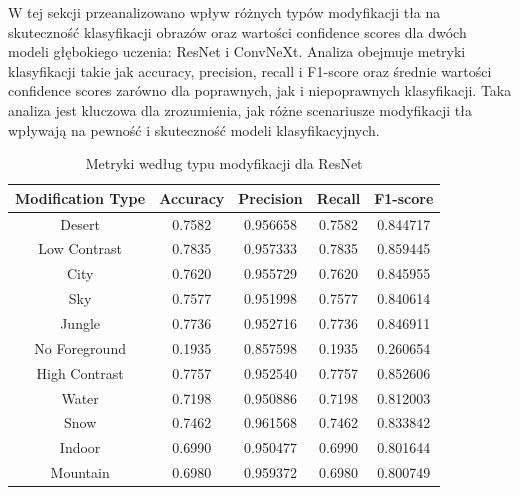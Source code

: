 W tej sekcji przeanalizowano wpływ różnych typów modyfikacji tła na skuteczność klasyfikacji obrazów oraz wartości confidence scores dla dwóch 
modeli głębokiego uczenia: ResNet i ConvNeXt. Analiza obejmuje metryki klasyfikacji takie jak accuracy, precision, recall i F1-score oraz 
średnie wartości confidence scores zarówno dla poprawnych, jak i niepoprawnych klasyfikacji. Taka analiza jest kluczowa dla zrozumienia, jak 
różne scenariusze modyfikacji tła wpływają na pewność i skuteczność modeli klasyfikacyjnych.

\begin{table}
	\centering
	\begin{tabular}{|c|c|c|c|c|}
		\hline
		\textbf{Modification Type} & \textbf{Accuracy} & \textbf{Precision} & \textbf{Recall} & \textbf{F1-score} \\
		\hline
		Desert & 0.7582 & 0.956658 & 0.7582 & 0.844717 \\
		\hline
		Low Contrast & 0.7835 & 0.957333 & 0.7835 & 0.859445 \\
		\hline
		City & 0.7620 & 0.955729 & 0.7620 & 0.845955 \\
		\hline
		Sky & 0.7577 & 0.951998 & 0.7577 & 0.840614 \\
		\hline
		Jungle & 0.7736 & 0.952716 & 0.7736 & 0.846911 \\
		\hline
		No Foreground & 0.1935 & 0.857598 & 0.1935 & 0.260654 \\
		\hline
		High Contrast & 0.7757 & 0.952540 & 0.7757 & 0.852606 \\
		\hline
		Water & 0.7198 & 0.950886 & 0.7198 & 0.812003 \\
		\hline
		Snow & 0.7462 & 0.961568 & 0.7462 & 0.833842 \\
		\hline
		Indoor & 0.6990 & 0.950477 & 0.6990 & 0.801644 \\
		\hline
		Mountain & 0.6980 & 0.959372 & 0.6980 & 0.800749 \\
		\hline
	\end{tabular}
	\caption{Metryki według typu modyfikacji dla ResNet}
	\label{tab:resnet_metrics_modification}
\end{table}

